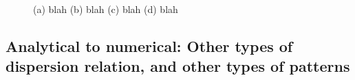 \begin{adjustbox}{width=1.4\textwidth,center}
\begin{figure}

    \caption{(a) blah (b) blah (c) blah (d) blah}
    \label{fig:foobar}
\end{figure}
\end{adjustbox}


\subsection{Analytical to numerical: Other types of dispersion relation, and other types of patterns}

